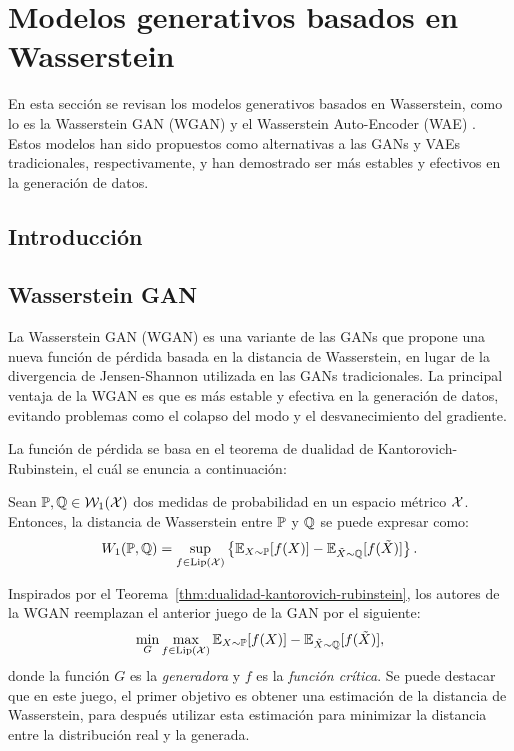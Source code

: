 \chapter{Modelos generativos basados en Wasserstein}
\label{chap:modelos-generativos-basados-en-Wasserstein}
{
En esta sección se revisan los modelos generativos basados en Wasserstein, como lo es la Wasserstein GAN (WGAN) \cite{arjovsky2017wasserstein} y el Wasserstein Auto-Encoder (WAE) \cite{tolstikhin2017wasserstein}. Estos modelos han sido propuestos como alternativas a las GANs y VAEs tradicionales, respectivamente, y han demostrado ser más estables y efectivos en la generación de datos.

\section{Introducción}\label{sec:model-gen-wass-Introducción}
{

}  %

\section{Wasserstein GAN}\label{sec:WGAN}
{
La Wasserstein GAN (WGAN) \cite{arjovsky2017wasserstein} es una variante de las GANs que propone una nueva función de pérdida basada en la distancia de Wasserstein, en lugar de la divergencia de Jensen-Shannon utilizada en las GANs tradicionales. La principal ventaja de la WGAN es que es más estable y efectiva en la generación de datos, evitando problemas como el colapso del modo y el desvanecimiento del gradiente.

La función de pérdida se basa en el teorema de dualidad de Kantorovich-Rubinstein, el cuál se enuncia a continuación:
\begin{theorem}\label{thm:dualidad-kantorovich-rubinstein}
    Sean $\Prob, \ProbQ \in \WassersteinSpace[1]{\cX}$ dos medidas de probabilidad en un espacio métrico $\mathcal{X}$. Entonces, la distancia de Wasserstein entre $\Prob$ y $\ProbQ$ se puede expresar como:
    \begin{equation}\label{eq:dualidad-kantorovich-rubinstein}
        \Wasserstein[1]{\Prob}{\ProbQ} = \sup_{f \in \Lip[\cX]} \left\{ \Exp_{X\sim \Prob} [f(X)] - \Exp_{\tilde X \sim \ProbQ} [f(\tilde X)] \right\}.
    \end{equation}
\end{theorem}

Inspirados por el Teorema~\ref{thm:dualidad-kantorovich-rubinstein}, los autores de la WGAN \cite{arjovsky2017wasserstein} reemplazan el anterior juego de la GAN por el siguiente:
\begin{equation}
    \min_{G} \max_{f \in \Lip[\cX]} \Exp_{X\sim \Prob} [f(X)] - \Exp_{\tilde X \sim \ProbQ} [f(\tilde X)],
\end{equation}
donde la función $G$ es la \textit{generadora} y $f$ es la \textit{función crítica}. Se puede destacar que en este juego, el primer objetivo es obtener una estimación de la distancia de Wasserstein, para después utilizar esta estimación para minimizar la distancia entre la distribución real y la generada.

}}
